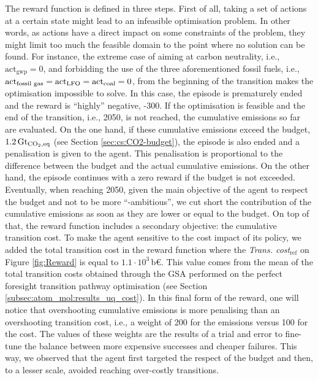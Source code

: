 \documentclass[11pt,twoside,a4paper,english]{article}
\def\ie{i.e., }
\begin{document}
\newpage
The reward function is defined in three steps. First of all, taking a set of actions at a certain state might lead to an infeasible optimisation problem. In other words, as actions have a direct impact on some constraints of the problem, they might limit too much the feasible domain to the point where no solution can be found. For instance, the extreme case of aiming at carbon neutrality, \ie $\mathrm{act}_{\mathrm{gwp}}=0$, and forbidding the use of the three aforementioned fossil fuels, \ie $\mathrm{act}\textsubscript{fossil gas}=\mathrm{act}\textsubscript{LFO}=\mathrm{act}\textsubscript{coal}=0$,  from the beginning of the transition makes the optimisation impossible to solve. In this case, the episode is prematurely ended and the reward is ``highly'' negative, -300. If the optimisation is feasible and the end of the transition, \ie 2050, is not reached, the cumulative emissions so far are evaluated. On the one hand, if these cumulative emissions exceed the  budget, $1.2\,\text{Gt}_{\ce{CO2},\text{eq}}$ (see Section \ref{sec:cs:CO2-budget}), the episode is also ended and a penalisation is given to the agent. This penalisation is proportional to the difference between the  budget and the actual cumulative emissions.  On the other hand, the episode continues with a zero reward if the  budget is not exceeded. Eventually, when reaching 2050, given the main objective of the agent to respect the  budget and not to be more ``-ambitious'', we cut short the contribution of the cumulative emissions as soon as they are lower or equal to the  budget.  On top of that, the reward function includes a secondary objective: the cumulative transition cost. To make the agent sensitive to the cost impact of its policy, we added the total transition cost in the reward function where the \emph{Trans. cost$_{\text{ref}}$} on Figure \ref{fig:Reward} is equal to $1.1\cdot10^3$\,b€. This value comes from the mean of the total transition costs obtained through the \gls{GSA} performed on the perfect foresight transition pathway optimisation (see Section \ref{subsec:atom_mol:results_uq_cost}). In this final form of the reward, one will notice that overshooting cumulative emissions is more penalising than an overshooting transition cost, \ie a weight of 200 for the emissions versus 100 for the cost. The values of these weights are the results of a trial and error to fine-tune the balance between more expensive successes and cheaper failures. This way, we observed that the agent first targeted the respect of the  budget and then, to a lesser scale, avoided reaching over-costly transitions.
\end{document}
